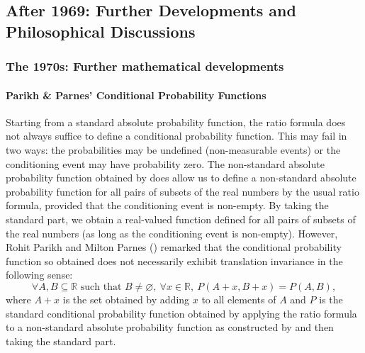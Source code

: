 \subsection{After 1969: Further Developments and Philosophical Discussions}\label{wenmackers-sec-after-1969}
\subsubsection*{The 1970s: Further mathematical developments}
\paragraph{Parikh \& Parnes' Conditional Probability Functions}
Starting from a standard absolute probability function, the ratio formula does not always suffice to define a conditional probability function. This may fail in two ways: the probabilities may be undefined (non-measurable events) or the conditioning event may have probability zero.
The non-standard absolute probability function obtained by \citet{BernsteinWattenberg:1969} does allow us to define a non-standard absolute probability function for all pairs of subsets of the real numbers by the usual ratio formula, provided that the conditioning event is non-empty. By taking the standard part, we obtain a real-valued function defined for all pairs of subsets of the real numbers (as long as the conditioning event is non-empty).
However, Rohit Parikh and Milton Parnes () remarked that the conditional probability function so obtained does not necessarily exhibit translation invariance in the following sense:
$$\forall A,B \subseteq \mathbb{R} \textrm{\ such\ that\ } B \neq \varnothing, \ \forall x \in \mathbb{R}, \ P(A+x,B+x)=P(A,B),$$
where $A+x$ is the set obtained by adding $x$ to all elements of $A$ and $P$ is the standard conditional probability function obtained by applying the ratio formula to a non-standard absolute probability function as constructed by \citet{BernsteinWattenberg:1969} and then taking the standard part.


